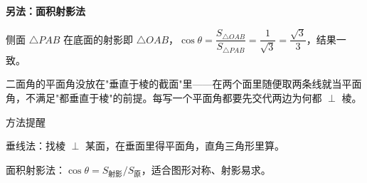 \documentclass{exam-zh}
\begin{document}
\begin{eduDualExplain}
  \begin{eduExplainLeft}
  \end{eduExplainLeft}

  \begin{eduExplainRight}
    \vspace{1mm}
    {\color{edu-blue}\bfseries\small 另法：面积射影法}\par\vspace{1mm}
    \begin{eduBulletList}
      \item 侧面 $\triangle PAB$ 在底面的射影即 $\triangle OAB$，$\cos\theta=\dfrac{S_{\triangle OAB}}{S_{\triangle PAB}}=\dfrac{1}{\sqrt3}=\dfrac{\sqrt3}{3}$，结果一致。    \end{eduBulletList}
  \end{eduExplainRight}
\end{eduDualExplain}




\begin{eduMistakeBox}
二面角的平面角没放在"垂直于棱的截面"里——在两个面里随便取两条线就当平面角，不满足"都垂直于棱"的前提。每写一个平面角都要先交代两边为何都 $\perp$ 棱。\end{eduMistakeBox}




\begin{eduSummaryBlock}{\eduIconPin}{方法提醒}
\begin{eduBulletList}
  \item 垂线法：找棱 $\perp$ 某面，在垂面里得平面角，直角三角形里算。  \item 面积射影法：$\cos\theta=S_{\text{射影}}/S_{\text{原}}$，适合图形对称、射影易求。\end{eduBulletList}
\end{eduSummaryBlock}
\end{document}
